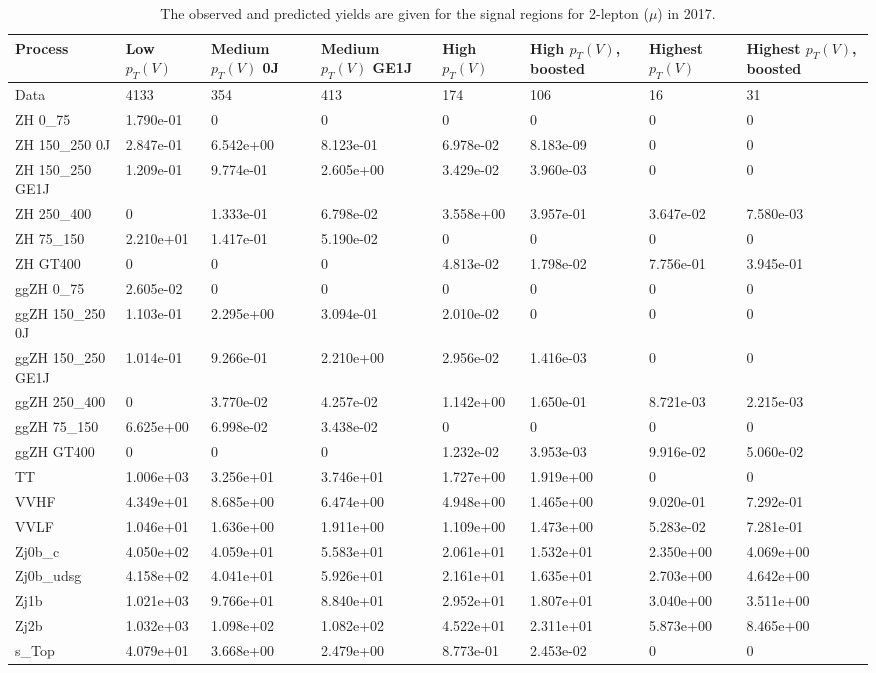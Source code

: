\begin{table}
\centering
\caption[2017 2-lepton ($\mu$) signal selection yields]{
                  The observed and predicted yields are given for the
                  signal regions for 2-lepton ($\mu$) in 2017.
                  }
{\footnotesize
\begin{tabularx}{\textwidth}{|X|X|X|X|X|X|X|X|}
\hline
Process & Low $p_{T}(V)$ & Medium $p_{T}(V)$ 0J & Medium $p_{T}(V)$ GE1J & High $p_{T}(V)$ & High $p_{T}(V)$, boosted & Highest $p_{T}(V)$ & Highest $p_{T}(V)$, boosted \\
\hline
Data & 4133 & 354 & 413 & 174 & 106 & 16 & 31 \\
\hline
ZH 0\_75 & 1.790e-01 & 0 & 0 & 0 & 0 & 0 & 0 \\
ZH 150\_250 0J & 2.847e-01 & 6.542e+00 & 8.123e-01 & 6.978e-02 & 8.183e-09 & 0 & 0 \\
ZH 150\_250 GE1J & 1.209e-01 & 9.774e-01 & 2.605e+00 & 3.429e-02 & 3.960e-03 & 0 & 0 \\
ZH 250\_400 & 0 & 1.333e-01 & 6.798e-02 & 3.558e+00 & 3.957e-01 & 3.647e-02 & 7.580e-03 \\
ZH 75\_150 & 2.210e+01 & 1.417e-01 & 5.190e-02 & 0 & 0 & 0 & 0 \\
ZH GT400 & 0 & 0 & 0 & 4.813e-02 & 1.798e-02 & 7.756e-01 & 3.945e-01 \\
ggZH 0\_75 & 2.605e-02 & 0 & 0 & 0 & 0 & 0 & 0 \\
ggZH 150\_250 0J & 1.103e-01 & 2.295e+00 & 3.094e-01 & 2.010e-02 & 0 & 0 & 0 \\
ggZH 150\_250 GE1J & 1.014e-01 & 9.266e-01 & 2.210e+00 & 2.956e-02 & 1.416e-03 & 0 & 0 \\
ggZH 250\_400 & 0 & 3.770e-02 & 4.257e-02 & 1.142e+00 & 1.650e-01 & 8.721e-03 & 2.215e-03 \\
ggZH 75\_150 & 6.625e+00 & 6.998e-02 & 3.438e-02 & 0 & 0 & 0 & 0 \\
ggZH GT400 & 0 & 0 & 0 & 1.232e-02 & 3.953e-03 & 9.916e-02 & 5.060e-02 \\
\hline
TT & 1.006e+03 & 3.256e+01 & 3.746e+01 & 1.727e+00 & 1.919e+00 & 0 & 0 \\
VVHF & 4.349e+01 & 8.685e+00 & 6.474e+00 & 4.948e+00 & 1.465e+00 & 9.020e-01 & 7.292e-01 \\
VVLF & 1.046e+01 & 1.636e+00 & 1.911e+00 & 1.109e+00 & 1.473e+00 & 5.283e-02 & 7.281e-01 \\
Zj0b\_c & 4.050e+02 & 4.059e+01 & 5.583e+01 & 2.061e+01 & 1.532e+01 & 2.350e+00 & 4.069e+00 \\
Zj0b\_udsg & 4.158e+02 & 4.041e+01 & 5.926e+01 & 2.161e+01 & 1.635e+01 & 2.703e+00 & 4.642e+00 \\
Zj1b & 1.021e+03 & 9.766e+01 & 8.840e+01 & 2.952e+01 & 1.807e+01 & 3.040e+00 & 3.511e+00 \\
Zj2b & 1.032e+03 & 1.098e+02 & 1.082e+02 & 4.522e+01 & 2.311e+01 & 5.873e+00 & 8.465e+00 \\
s\_Top & 4.079e+01 & 3.668e+00 & 2.479e+00 & 8.773e-01 & 2.453e-02 & 0 & 0 \\
\hline
\end{tabularx}
}
\label{tab:sr-Zmm-2017}
\end{table}

